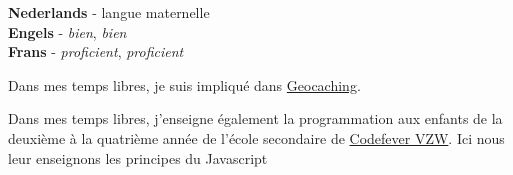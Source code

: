 \documentclass[9pt]{developercv} %
\begin{document}

\begin{minipage}[t]{0.3\textwidth}
	\vspace{-\baselineskip} %

	
	\textbf{Nederlands} - langue maternelle\\
	\textbf{Engels} -   \textit{bien},  \textit{bien}\\
	\textbf{Frans} -   \textit{proficient},  \textit{proficient}
\end{minipage}
\hfill
\begin{minipage}[t]{0.3\textwidth}
	\vspace{-\baselineskip} %
	
	
	Dans mes temps libres, je suis impliqu\'{e} dans \href{https://www.geocaching.com/}{Geocaching}.
\end{minipage}
\hfill
\begin{minipage}[t]{0.3\textwidth}
	\vspace{-\baselineskip} %
	

	Dans mes temps libres, j'enseigne également la programmation aux enfants de la deuxième à la quatrième année de l'école secondaire de \href{https://www.codefever.be/nl}{Codefever VZW}. Ici nous leur enseignons les principes du Javascript
\end{minipage}

\end{document}
